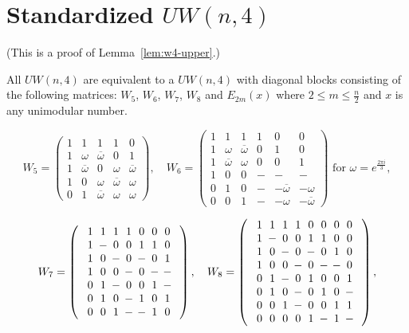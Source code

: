 \section[Standardized \texorpdfstring{$UW(n,4)$}{UW(n,4)}]{Standardized \texorpdfstring{$UW(n,4)$}{UW(n,4)}}
\label{app:uw-n4}

(This is a proof of Lemma~\ref{lem:w4-upper}.)

\begin{lemma}\label{lem-proof:w4-upper}
 
All $UW(n,4)$ are equivalent to a $UW(n,4)$ with diagonal blocks consisting of the following matrices: $W_5$, $W_6$, $W_7$, $W_8$ and $E_{2m}(x)$ where $2 \leq m \leq \frac{n}{2}$ and $x$ is any unimodular number.

$$
W_5=\left(
\begin{array}{rrrrr}
 1 & 1 &1 &1 &0 \\
 1 &  \omega &\overline{\omega} &0 &1\\
 1 & \overline{\omega} &0 &\omega &\overline{\omega} \\
 1 & 0 &\omega &\overline{\omega} & \omega \\
 0 & 1 & \overline{\omega} &\omega &\omega 
\end{array}
\right),\quad
W_6=\left(
\begin{array}{rrrrrr}
 1 & 1 &1 &1 &0 &0\\
 1 & \omega &\overline{\omega} &0 &1 &0\\
 1 & \overline{\omega} &\omega &0 &0 &1\\
 1 & 0 & 0 & - & - & - \\
 0 & 1 & 0 & - & -\overline{\omega} &-\omega \\
 0 & 0 & 1 & - & -\omega &-\overline{\omega}
\end{array}
\right)
\text{ for } \omega = e^{\frac{2\pi i}{3}},
$$

 $$W_7=\left(\begin{array}{c}
\Zp\Zp\Zp\Zp\Zz\Zz\Zz\\
\Zp\Zm\Zz\Zz\Zp\Zp\Zz\\
\Zp\Zz\Zm\Zz\Zm\Zz\Zp\\
\Zp\Zz\Zz\Zm\Zz\Zm\Zm\\
\Zz\Zp\Zm\Zz\Zz\Zp\Zm\\
\Zz\Zp\Zz\Zm\Zp\Zz\Zp\\
\Zz\Zz\Zp\Zm\Zm\Zp\Zz
\end{array}\right), \quad
W_8=\left(\begin{array}{c}
\Zp\Zp\Zp\Zp\Zz\Zz\Zz\Zz\\
\Zp\Zm\Zz\Zz\Zp\Zp\Zz\Zz\\
\Zp\Zz\Zm\Zz\Zm\Zz\Zp\Zz\\
\Zp\Zz\Zz\Zm\Zz\Zm\Zm\Zz\\
\Zz\Zp\Zm\Zz\Zp\Zz\Zz\Zp\\
\Zz\Zp\Zz\Zm\Zz\Zp\Zz\Zm\\
\Zz\Zz\Zp\Zm\Zz\Zz\Zp\Zp\\
\Zz\Zz\Zz\Zz\Zp\Zm\Zp\Zm
\end{array}\right),$$



\end{lemma}
